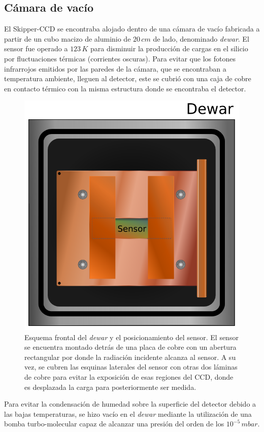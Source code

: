 \subsection{Cámara de vacío}
\noindent El Skipper-CCD se encontraba alojado dentro de una cámara de vacío fabricada a partir de un cubo macizo de aluminio de $20\,\si{cm}$ de lado, denominado \textit{dewar}. El sensor fue operado a $123\,\si{K}$ para disminuir la producción de cargas en el silicio por fluctuaciones térmicas (corrientes oscuras). Para evitar que los fotones infrarrojos emitidos por las paredes de la cámara, que se encontraban a temperatura ambiente, lleguen al detector, este se cubrió con una caja de cobre en contacto térmico con la misma estructura donde se encontraba el detector. 
\begin{figure}[h]
    \centering
    \includegraphics[scale=0.5]{Figs/Frontal_Dewar_Sensor.pdf}
    \caption{Esquema frontal del \textit{dewar} y el posicionamiento del sensor. El sensor se encuentra montado detrás de una placa de cobre con un abertura rectangular por donde la radiación incidente alcanza al sensor. A su vez, se cubren las esquinas laterales del sensor con otras dos láminas de cobre para evitar la exposición de esas regiones del CCD, donde es desplazada la carga para posteriormente ser medida.}
    \label{fig:FrontalDewarYSensor}
\end{figure}
Para evitar la condensación de humedad sobre la superficie del detector debido a las bajas temperaturas, se hizo vacío en el \textit{dewar} mediante la utilización de una bomba turbo-molecular capaz de alcanzar una presión del orden de los $10^{-5}\,\si{mbar}$.

